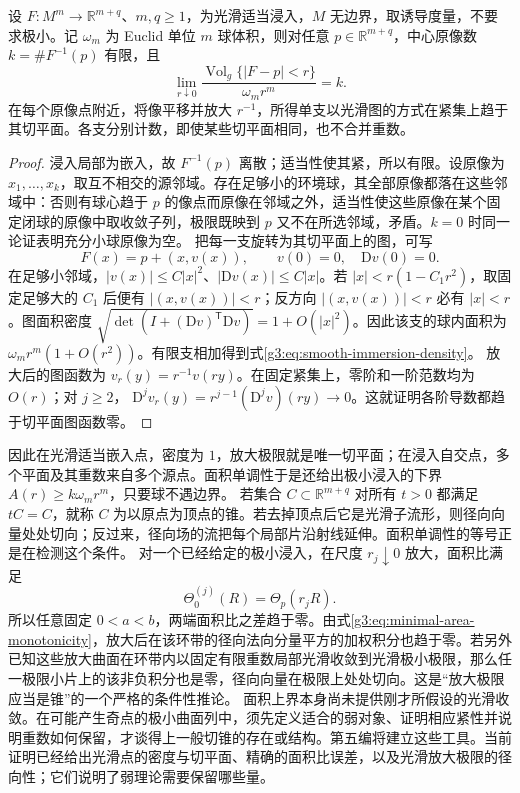\begin{proposition}\label{g3:prop:smooth-immersion-density}
	设 \(F:M^m\to\mathbb R^{m+q}\)、\(m,q\ge1\)，为光滑适当浸入，\(M\) 无边界，取诱导度量，不要求极小。记 \(\omega_m\) 为 Euclid 单位 \(m\) 球体积，则对任意 \(p\in\mathbb R^{m+q}\)，中心原像数 \(k=\#F^{-1}(p)\) 有限，且
	\begin{equation}\label{g3:eq:smooth-immersion-density}
		\lim_{r\downarrow0}\frac{\operatorname{Vol}_g\{|F-p|<r\}}{\omega_mr^m}=k.
	\end{equation}
	在每个原像点附近，将像平移并放大 \(r^{-1}\)，所得单支以光滑图的方式在紧集上趋于其切平面。各支分别计数，即使某些切平面相同，也不合并重数。
\end{proposition}
\begin{proof}
	浸入局部为嵌入，故 \(F^{-1}(p)\) 离散；适当性使其紧，所以有限。设原像为 \(x_1,\ldots,x_k\)，取互不相交的源邻域。存在足够小的环境球，其全部原像都落在这些邻域中：否则有球心趋于 \(p\) 的像点而原像在邻域之外，适当性使这些原像在某个固定闭球的原像中取收敛子列，极限既映到 \(p\) 又不在所选邻域，矛盾。\(k=0\) 时同一论证表明充分小球原像为空。
	把每一支旋转为其切平面上的图，可写
	\[
		F(x)=p+(x,v(x)),\qquad v(0)=0,\quad\mathrm Dv(0)=0.
	\]
	在足够小邻域，\(|v(x)|\le C|x|^2\)、\(|\mathrm Dv(x)|\le C|x|\)。若 \(|x|<r(1-C_1r^2)\)，取固定足够大的 \(C_1\) 后便有 \(|(x,v(x))|<r\)；反方向 \(|(x,v(x))|<r\) 必有 \(|x|<r\)。图面积密度
	\(\sqrt{\det(I+(\mathrm Dv)^{\mathsf T}\mathrm Dv)}=1+O(|x|^2)\)。因此该支的球内面积为 \(\omega_mr^m(1+O(r^2))\)。有限支相加得到式\eqref{g3:eq:smooth-immersion-density}。
	放大后的图函数为 \(v_r(y)=r^{-1}v(ry)\)。在固定紧集上，零阶和一阶范数均为 \(O(r)\)；对 \(j\ge2\)，
	\(\mathrm D^jv_r(y)=r^{j-1}(\mathrm D^jv)(ry)\to0\)。这就证明各阶导数都趋于切平面图函数零。
\end{proof}

因此在光滑适当嵌入点，密度为 \(1\)，放大极限就是唯一切平面；在浸入自交点，多个平面及其重数来自多个源点。面积单调性于是还给出极小浸入的下界 \(A(r)\ge k\omega_mr^m\)，只要球不遇边界。
\ProseParagraphBreak
若集合 \(C\subset\mathbb R^{m+q}\) 对所有 \(t>0\) 都满足 \(tC=C\)，就称 \(C\) 为以原点为顶点的锥。若去掉顶点后它是光滑子流形，则径向向量处处切向；反过来，径向场的流把每个局部片沿射线延伸。面积单调性的等号正是在检测这个条件。
\ProseParagraphBreak
对一个已经给定的极小浸入，在尺度 \(r_j\downarrow0\) 放大，面积比满足
\[
	\Theta^{(j)}_0(R)=\Theta_p(r_jR).
\]
所以任意固定 \(0<a<b\)，两端面积比之差趋于零。由式\eqref{g3:eq:minimal-area-monotonicity}，放大后在该环带的径向法向分量平方的加权积分也趋于零。若另外已知这些放大曲面在环带内以固定有限重数局部光滑收敛到光滑极小极限，那么任一极限小片上的该非负积分也是零，径向向量在极限上处处切向。这是“放大极限应当是锥”的一个严格的条件性推论。
\ProseParagraphBreak
面积上界本身尚未提供刚才所假设的光滑收敛。在可能产生奇点的极小曲面列中，须先定义适合的弱对象、证明相应紧性并说明重数如何保留，才谈得上一般切锥的存在或结构。第五编将建立这些工具。当前证明已经给出光滑点的密度与切平面、精确的面积比误差，以及光滑放大极限的径向性；它们说明了弱理论需要保留哪些量。
